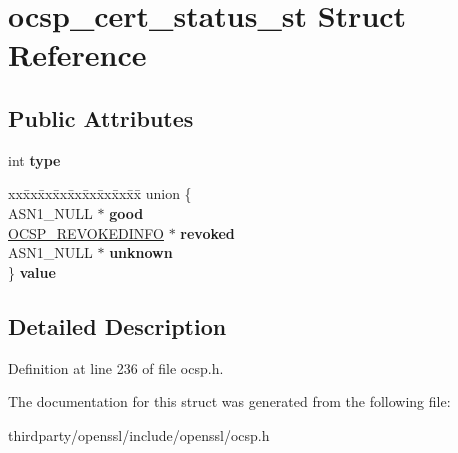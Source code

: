 \hypertarget{structocsp__cert__status__st}{}\section{ocsp\+\_\+cert\+\_\+status\+\_\+st Struct Reference}
\label{structocsp__cert__status__st}
\subsection*{Public Attributes}
\begin{DoxyCompactItemize}
\item 
\mbox{\label{structocsp__cert__status__st_a8e834ed8fedd7e6709723625989a2dcf}} 
int {\bfseries type}
\item 
\mbox{\label{structocsp__cert__status__st_a21f35b399e25a6f3a332ed8b38b0aab0}} 
\begin{tabbing}
xx\=xx\=xx\=xx\=xx\=xx\=xx\=xx\=xx\=\kill
union \{\\
\>ASN1\_NULL $\ast$ {\bfseries good}\\
\>\hyperlink{structocsp__revoked__info__st}{OCSP\_REVOKEDINFO} $\ast$ {\bfseries revoked}\\
\>ASN1\_NULL $\ast$ {\bfseries unknown}\\
\} {\bfseries value}\\

\end{tabbing}\end{DoxyCompactItemize}


\subsection{Detailed Description}


Definition at line 236 of file ocsp.\+h.



The documentation for this struct was generated from the following file\+:\begin{DoxyCompactItemize}
\item 
thirdparty/openssl/include/openssl/ocsp.\+h\end{DoxyCompactItemize}

